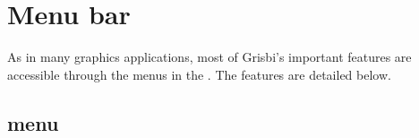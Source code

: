 
\section{Menu bar\label{home-menus}}

As in many graphics applications, most of Grisbi's important features are accessible through the menus in the . The features are detailed below.


\subsection{ menu\label{home-menus-file}}

